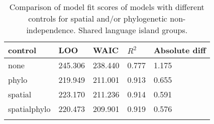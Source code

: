 \begin{longtable}{p{2cm}p{2cm}p{2cm}p{2cm}p{2cm}}
  \toprule
control & LOO & WAIC & $R^2$ & Absolute diff \\ 
  \midrule
none & 245.306 & 238.440 & 0.777 & 1.175 \\ 
  phylo & 219.949 & 211.001 & 0.913 & 0.655 \\ 
  spatial & 223.170 & 211.236 & 0.914 & 0.591 \\ 
  spatialphylo & 220.473 & 209.901 & 0.919 & 0.576 \\ 
   \bottomrule
\caption{Comparison of model fit scores of models with different controls for spatial and/or phylogenetic non-independence. Shared language island groups.} 
\label{model_fit_score_table_medium}
\end{longtable}
